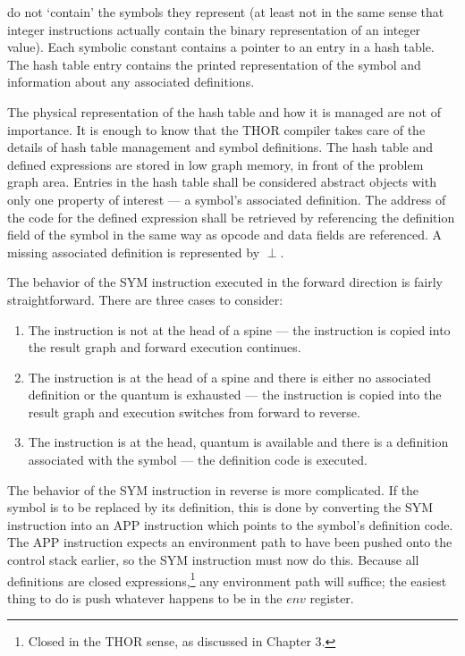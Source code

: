 
do not `contain' the symbols they represent (at least not in the same sense that integer
instructions actually contain the binary representation of an integer value). Each symbolic
constant contains a pointer to an entry in a hash table. The hash table entry contains the
printed representation of the symbol and information about any associated definitions.

The physical representation of the hash table and how it is managed are not of importance.
It is enough to know that the THOR compiler takes care of the details of hash table
management and symbol definitions. The hash table and defined expressions are stored in
low graph memory, in front of the problem graph area. Entries in the hash table shall be
considered abstract objects with only one property of interest --- a symbol's associated
definition. The address of the code for the defined expression shall be retrieved by
referencing the definition field of the symbol in the same way as opcode and data fields
are referenced. A missing associated definition is represented by \(\perp\).

The behavior of the SYM instruction executed in the forward direction is fairly
straightforward. There are three cases to consider:

\begin{enumerate}
\item The instruction is not at the head of a spine --- the instruction is copied into the result graph and forward execution continues.

\item The instruction is at the head of a spine and there is either no associated definition or the quantum is exhausted --- the instruction is copied into the result graph and execution switches from forward to reverse.

\item The instruction is at the head, quantum is available and there is a definition associated with the symbol --- the definition code is executed.
\end{enumerate}

The behavior of the SYM instruction in reverse is more complicated. If the symbol is to
be replaced by its definition, this is done by converting the SYM instruction into an APP
instruction which points to the symbol's definition code. The APP instruction expects an
environment path to have been pushed onto the control stack earlier, so the SYM instruction
must now do this. Because all definitions are closed expressions,\footnote{Closed in the
THOR sense, as discussed in Chapter 3.} any environment path will suffice; the easiest
thing to do is push whatever happens to be in the \(env\) register.

